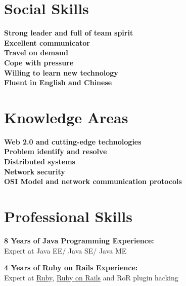 
\section{Social Skills}
{\textbf{Strong leader and full of team spirit}}\\
{\textbf{Excellent communicator}}\\
{\textbf{Travel on demand}}\\
{\textbf{Cope with pressure}}\\
{\textbf{Willing to learn new technology}}\\
{\textbf{Fluent in English and Chinese}}\\


\section{Knowledge Areas}
{\textbf{Web 2.0 and cutting-edge technologies}}\\
{\textbf{Problem identify and resolve}}\\
{\textbf{Distributed systems}}\\ 
{\textbf{Network security}}\\ 
{\textbf{OSI Model and network communication protocols}}\\


\section{Professional Skills} 
%
{\textbf{8 Years of Java Programming Experience:}}\\
Expert at Java EE/ Java SE/ Java ME

\blankline

{\textbf{4 Years of Ruby \nolinebreak on \nolinebreak Rails Experience:}}\\
Expert at 
\href{http://www.ruby-lang.org/en/}{Ruby}, 
\href{http://rubyonrails.org/}{Ruby on Rails} and RoR plugin hacking

